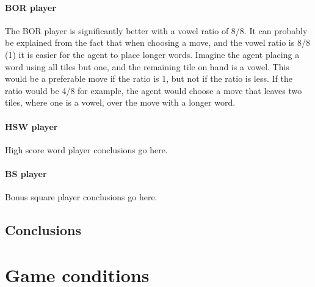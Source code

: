 \documentclass[a4paper, 12pt]{report}
\begin{document}
\subsubsection{BOR player}
The BOR player is significantly better with a vowel ratio of 8/8. It can probably be explained from the fact that when choosing a move, and the vowel ratio is 8/8 (1) it is easier for the agent to place longer words. Imagine the agent placing a word using all tiles but one, and the remaining tile on hand is a vowel. This would be a preferable move if the ratio is 1, but not if the ratio is less. If the ratio would be 4/8 for example, the agent would choose a move that leaves two tiles, where one is a vowel, over the move with a longer word. 

\subsubsection{HSW player}
High score word player conclusions go here.

\subsubsection{BS player}
Bonus square player conclusions go here.

\section{Conclusions}


\appendix
\chapter{Game conditions}
\graphicspath{{images/}}
\end{document}
